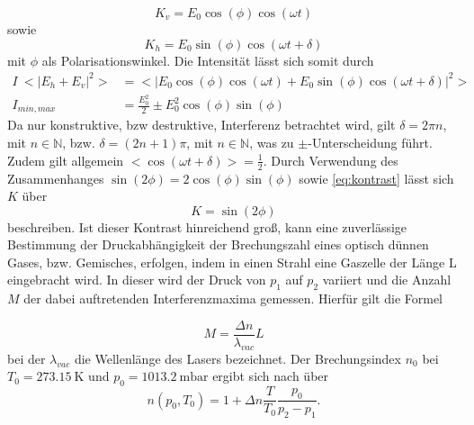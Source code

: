 \begin{equation}
	K_v = E_0 \cos (\phi) \cos(\omega t)
\end{equation}
sowie
\begin{equation}
	K_h = E_0 \sin(\phi) \cos(\omega t + \delta)
\end{equation}
mit $\phi$ als Polarisationswinkel. Die Intensität lässt sich somit durch
\begin{align*}
	I ~ <|E_h+E_v|^2> &=<| E_0 \cos (\phi) \cos(\omega t) +  E_0 \sin(\phi) \cos(\omega t + \delta)|^2> \\
	I_{min,max}  &= \frac{E_0^2}{2} \pm E_0^2 \cos(\phi)\sin(\phi)
\end{align*}
Da nur konstruktive, bzw destruktive, Interferenz betrachtet wird, gilt $\delta = 2\pi n$, mit $n \in \mathbb{N}$, bzw. $\delta = (2n+1)\pi$, mit $n \in \mathbb{N}$, was zu $\pm$-Unterscheidung führt. Zudem gilt allgemein $<\cos(\omega t + \delta)> = \frac{1}{2}$.
Durch Verwendung des Zusammenhanges $\sin(2 \phi) =2 \cos(\phi)\sin(\phi)$ sowie \eqref{eq:kontrast} lässt sich  $K$ über
\begin{equation}
	K = \sin(2 \phi)
	\label{eq:K}
\end{equation}
beschreiben.
Ist dieser Kontrast hinreichend groß, kann eine zuverlässige Bestimmung der Druckabhängigkeit der Brechungszahl eines optisch dünnen Gases, bzw. Gemisches, erfolgen, indem in einen Strahl eine Gaszelle der Länge L eingebracht wird. In dieser wird der Druck von $p_1$ auf $p_2$ variiert und die Anzahl $M$ der dabei auftretenden Interferenzmaxima gemessen. Hierfür gilt die Formel

\begin{equation}
	M = \frac{\Delta n}{\lambda_{vac}} L
\end{equation}
bei der $\lambda_{vac}$ die Wellenlänge des Lasers bezeichnet.
Der Brechungsindex $n_0$ bei $T_0 = \SI{273,15}{\kelvin}$ und $p_0 =  \SI{1013,2}{\milli\bar}$ ergibt sich nach \cite{AltAnleitung} über
\begin{equation}
	n(p_0,T_0)=1+ \Delta n \frac{T}{T_0} \frac{p_0}{p_2-p_1}.
	\label{eqn:n0}
\end{equation}

